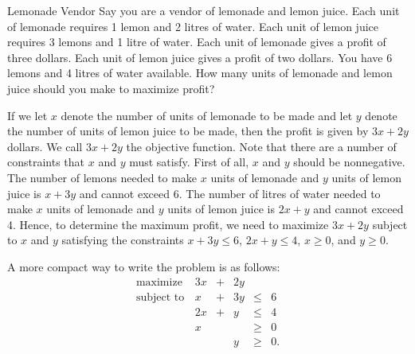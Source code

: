 \begin{example}{Lemonade Vendor}\label{exa:lemonadevendor}
Say you are a vendor of lemonade and lemon juice. Each unit of lemonade
requires 1 lemon and 2 litres of water. Each unit of lemon juice
requires 3 lemons and 1 litre of water. Each unit of lemonade gives a
profit of three dollars. Each unit of lemon juice gives a profit of two
dollars. You have 6 lemons and 4 litres of water available. How many
units of lemonade and lemon juice should you make to maximize profit?

If we let \(x\) denote the number of units of lemonade to be made and
let \(y\) denote the number of units of lemon juice to be made, then the
profit is given by \(3x + 2y\) dollars. We call \(3x + 2y\) the
objective function. Note that there are a number of constraints that
\(x\) and \(y\) must satisfy. First of all, \(x\) and \(y\) should be
nonnegative. The number of lemons needed to make \(x\) units of lemonade
and \(y\) units of lemon juice is \(x+3y\) and cannot exceed 6. The
number of litres of water needed to make \(x\) units of lemonade and
\(y\) units of lemon juice is \(2x+y\) and cannot exceed 4. Hence, to
determine the maximum profit, we need to maximize \(3x + 2y\) subject to
\(x\) and \(y\) satisfying the constraints \(x + 3y \leq 6\),
\(2x + y \leq 4\), \(x \geq 0\), and \(y \geq 0.\)

A more compact way to write the problem is as follows:
\[\begin{array}{rrcrll}
\text{maximize } & 3x & + & 2y & \\
\text{subject to}
& x & + & 3y & \leq & 6 \\
& 2x & +&  y & \leq & 4 \\
& x &  & & \geq & 0 \\
& & & y & \geq & 0. \\
\end{array}\]

\end{example}

